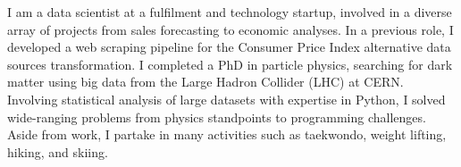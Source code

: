 
\begin{cvparagraph}
    I am a data scientist at a fulfilment and technology startup, involved in a diverse array of projects from sales forecasting to economic analyses.
    In a previous role, I developed a web scraping pipeline for the Consumer Price Index alternative data sources transformation.
    I completed a PhD in particle physics, searching for dark matter using big data from the Large Hadron Collider (LHC) at CERN\@.
    Involving statistical analysis of large datasets with expertise in Python, I solved wide-ranging problems from physics standpoints to programming challenges.
    Aside from work, I partake in many activities such as taekwondo, weight lifting, hiking, and skiing.
\end{cvparagraph}
